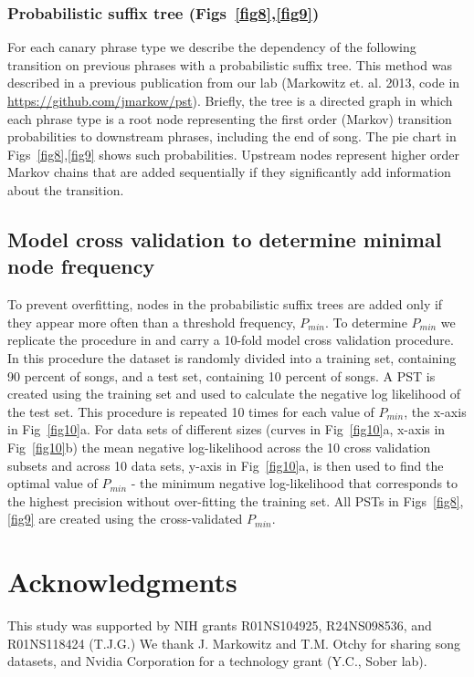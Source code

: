 \documentclass[10pt,letterpaper]{article}
\begin{document}
\subsubsection*{Probabilistic suffix tree (Figs~\ref{fig8},\ref{fig9})}
For each canary phrase type we describe the dependency of the following transition on previous phrases with a probabilistic suffix tree. This method was described in a previous publication from our lab (Markowitz et. al. 2013, code in \url{https://github.com/jmarkow/pst}). Briefly, the tree is a directed graph in which each phrase type is a root node representing the first order (Markov) transition probabilities to downstream phrases, including the end of song. The pie chart in Figs~\ref{fig8},\ref{fig9} shows such probabilities. Upstream nodes represent higher order Markov chains that are added sequentially if they significantly add information about the transition.
\subsection*{Model cross validation to determine minimal node frequency}
To prevent overfitting, nodes in the probabilistic suffix trees are added only if they appear more often than a threshold frequency, $P_{min}$. To determine $P_{min}$ we replicate the procedure in \cite{markowitz_long-range_2013} and carry a 10-fold model cross validation procedure. In this procedure the dataset is randomly divided into a training set, containing 90 percent of songs, and a test set, containing 10 percent of songs. A PST is created using the training set and used to calculate the negative log likelihood of the test set. This procedure is repeated 10 times for each value of $P_{min}$, the x-axis in Fig~\ref{fig10}a. For data sets of different sizes (curves in Fig~\ref{fig10}a, x-axis in Fig~\ref{fig10}b) the mean negative log-likelihood across the 10 cross validation subsets and across 10 data sets, y-axis in Fig~\ref{fig10}a, is then used to find the optimal value of $P_{min}$ - the minimum negative log-likelihood that corresponds to the highest precision without over-fitting the training set. All PSTs in Figs~\ref{fig8},\ref{fig9} are created using the cross-validated $P_{min}$.

\section*{Acknowledgments}
This study was supported by NIH grants R01NS104925,
R24NS098536, and R01NS118424 (T.J.G.) We thank J. Markowitz and T.M. Otchy for sharing song datasets, and Nvidia Corporation for a technology grant (Y.C., Sober lab).
\end{document}
